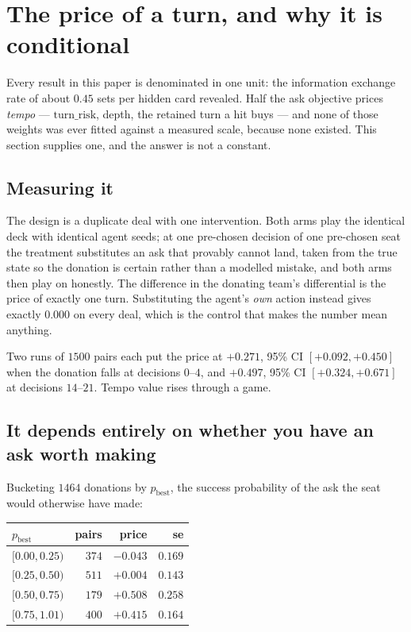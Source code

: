 \documentclass[11pt,a4paper]{article}
\begin{document}
\section{The price of a turn, and why it is conditional}
\label{sec:tempo}

Every result in this paper is denominated in one unit: the information exchange
rate of about $0.45$ sets per hidden card revealed. Half the ask objective
prices \emph{tempo} --- $\mathrm{turn\_risk}$, depth, the retained turn a hit
buys --- and none of those weights was ever fitted against a measured scale,
because none existed. This section supplies one, and the answer is not a
constant.

\subsection{Measuring it}

The design is a duplicate deal with one intervention. Both arms play the
identical deck with identical agent seeds; at one pre-chosen decision of one
pre-chosen seat the treatment substitutes an ask that provably cannot land,
taken from the true state so the donation is certain rather than a modelled
mistake, and both arms then play on honestly. The difference in the donating
team's differential is the price of exactly one turn. Substituting the agent's
\emph{own} action instead gives exactly $0.000$ on every deal, which is the
control that makes the number mean anything.

Two runs of $1500$ pairs each put the price at $+0.271$, 95\% CI
$[+0.092, +0.450]$ when the donation falls at decisions $0$--$4$, and $+0.497$,
95\% CI $[+0.324, +0.671]$ at decisions $14$--$21$. Tempo value rises through a
game.

\subsection{It depends entirely on whether you have an ask worth making}

Bucketing $1464$ donations by $p_{\text{best}}$, the success probability of the
ask the seat would otherwise have made:

\begin{center}
\begin{tabular}{lrrr}
\toprule
$p_{\text{best}}$ & pairs & price & se \\
\midrule
$[0.00, 0.25)$ & $374$ & $-0.043$ & $0.169$ \\
$[0.25, 0.50)$ & $511$ & $+0.004$ & $0.143$ \\
$[0.50, 0.75)$ & $179$ & $\mathbf{+0.508}$ & $0.258$ \\
$[0.75, 1.01)$ & $400$ & $\mathbf{+0.415}$ & $0.164$ \\
\bottomrule
\end{tabular}
\end{center}
\end{document}
